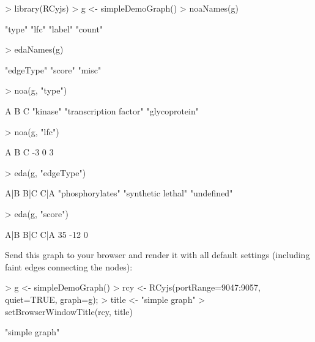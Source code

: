 \documentclass{article}
\begin{document}
\begin{Schunk}
\begin{Sinput}
> library(RCyjs)
> g <- simpleDemoGraph()
> noaNames(g)
\end{Sinput}
\begin{Soutput}
[1] "type"  "lfc"   "label" "count"
\end{Soutput}
\begin{Sinput}
> edaNames(g)
\end{Sinput}
\begin{Soutput}
[1] "edgeType" "score"    "misc"    
\end{Soutput}
\begin{Sinput}
> noa(g, "type")
\end{Sinput}
\begin{Soutput}
                     A                      B                      C 
              "kinase" "transcription factor"         "glycoprotein" 
\end{Soutput}
\begin{Sinput}
> noa(g, "lfc")
\end{Sinput}
\begin{Soutput}
 A  B  C 
-3  0  3 
\end{Soutput}
\begin{Sinput}
> eda(g, "edgeType")
\end{Sinput}
\begin{Soutput}
               A|B                B|C                C|A 
  "phosphorylates" "synthetic lethal"        "undefined" 
\end{Soutput}
\begin{Sinput}
> eda(g, "score")
\end{Sinput}
\begin{Soutput}
A|B B|C C|A 
 35 -12   0 
\end{Soutput}
\end{Schunk}

Send this graph to your browser and render it with all default settings (including faint edges connecting the nodes):
\begin{Schunk}
\begin{Sinput}
> g <- simpleDemoGraph()
> rcy <- RCyjs(portRange=9047:9057, quiet=TRUE, graph=g);
> title <- "simple graph"
> setBrowserWindowTitle(rcy, title)
\end{Sinput}
\begin{Soutput}
[1] "simple graph"
\end{Soutput}
\end{Schunk}
\end{document}
